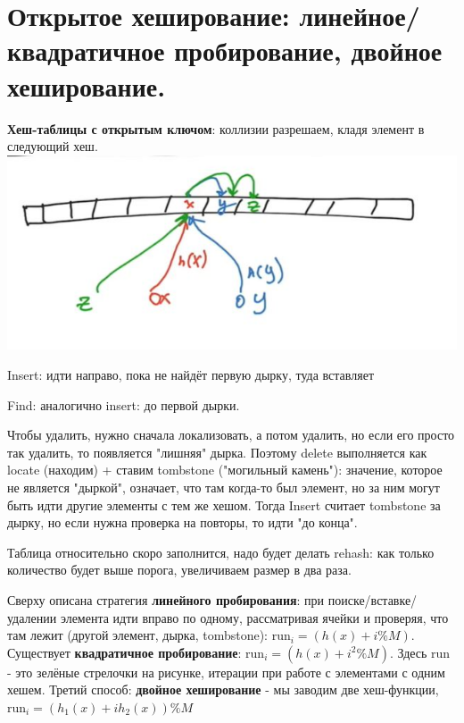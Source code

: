 \section{Открытое хеширование: линейное/квадратичное пробирование, двойное хеширование.}
\textbf{Хеш-таблицы с открытым ключом}: коллизии разрешаем, кладя элемент в следующий хеш. \\
\includegraphics{images/76-83_open key} \par
Insert: идти направо, пока не найдёт первую дырку, туда вставляет \par
Find: аналогично insert: до первой дырки. \par
Чтобы удалить, нужно сначала локализовать, а потом удалить, но если его просто так удалить, то появляется "лишняя" дырка. Поэтому delete выполняется как locate (находим) + ставим tombstone ("могильный камень"): значение, которое не является "дыркой", означает, что там когда-то был элемент, но за ним могут быть идти другие элементы с тем же хешом. Тогда Insert считает tombstone за дырку, но если нужна проверка на повторы, то идти "до конца". \par
Таблица относительно скоро заполнится, надо будет делать rehash: как только количество будет выше порога, увеличиваем размер в два раза. \par
Сверху описана стратегия \textbf{линейного пробирования}: при поиске/вставке/удалении элемента идти вправо по одному, рассматривая ячейки и проверяя, что там лежит (другой элемент, дырка, tombstone): run$_i = (h(x) + i \% M)$. Существует \textbf{квадратичное пробирование}: run$_i = (h(x) + i^2 \% M)$. Здесь run - это зелёные стрелочки на рисунке, итерации при работе с элементами с одним хешем. Третий способ: \textbf{двойное хеширование} - мы заводим две хеш-функции, run$_i = (h_1(x) + i h_2(x)) \% M$

\setcounter{section}{81}

